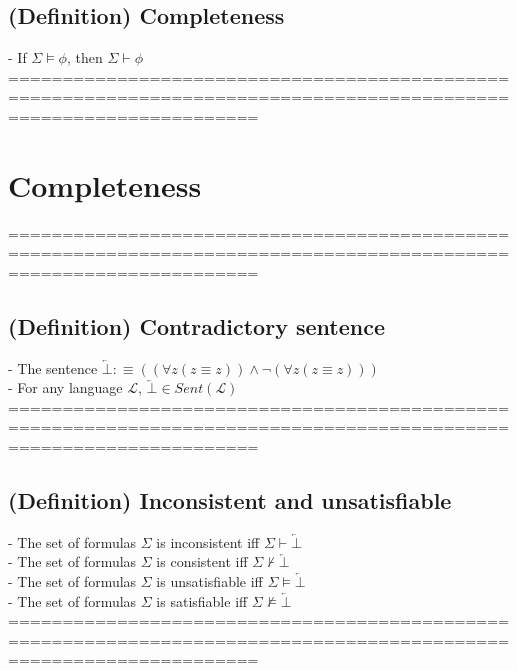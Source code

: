 \documentclass{book}
\newcommand{\is}{:\equiv}
\newcommand{\inot}{\not}
\newcommand{\contr}{\overleftarrow{\bot}}
\begin{document}
\subsection{(Definition) Completeness} %
	- If $\Sigma \vDash \phi$, then $\Sigma \vdash \phi$ \\
	===================================================================================================================

\section{Completeness}
	===================================================================================================================
\subsection{(Definition) Contradictory sentence} %
	- The sentence $\contr \is ((\forall z (z \equiv z)) \land \lnot (\forall z (z \equiv z)))$ \\
	- For any language $\mathcal{L}$, $\contr \in Sent(\mathcal{L})$ \\
	===================================================================================================================
\subsection{(Definition) Inconsistent and unsatisfiable} %
	- The set of formulas $\Sigma$ is inconsistent iff $\Sigma \vdash \contr$ \\
	- The set of formulas $\Sigma$ is consistent iff $\Sigma \inot \vdash \contr$ \\
	- The set of formulas $\Sigma$ is unsatisfiable iff $\Sigma \vDash \contr$ \\
	- The set of formulas $\Sigma$ is satisfiable iff $\Sigma \inot \vDash \contr$ \\
	===================================================================================================================
\end{document}
